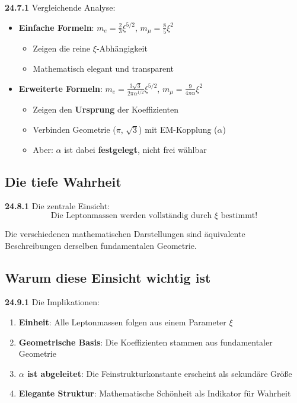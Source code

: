 \documentclass[12pt,a4paper]{article}
\begin{document}
\noindent \textbf{24.7.1} Vergleichende Analyse:
\begin{itemize}
	\item \textbf{Einfache Formeln}: $m_e = \frac{2}{3}\xi^{5/2}$, $m_\mu = \frac{8}{5}\xi^2$
	\begin{itemize}
		\item Zeigen die reine $\xi$-Abhängigkeit
		\item Mathematisch elegant und transparent
	\end{itemize}
	
	\item \textbf{Erweiterte Formeln}: $m_e = \frac{3\sqrt{3}}{2\pi\alpha^{1/2}}\xi^{5/2}$, $m_\mu = \frac{9}{4\pi\alpha}\xi^2$
	\begin{itemize}
		\item Zeigen den \textbf{Ursprung} der Koeffizienten
		\item Verbinden Geometrie ($\pi$, $\sqrt{3}$) mit EM-Kopplung ($\alpha$)
		\item Aber: $\alpha$ ist dabei \textbf{festgelegt}, nicht frei wählbar
	\end{itemize}
\end{itemize}

\subsection{Die tiefe Wahrheit}

\noindent \textbf{24.8.1} Die zentrale Einsicht:
\[
\boxed{
	\text{Die Leptonmassen werden vollständig durch } \xi \text{ bestimmt!}
}
\]

Die verschiedenen mathematischen Darstellungen sind äquivalente Beschreibungen derselben fundamentalen Geometrie.

\subsection{Warum diese Einsicht wichtig ist}

\noindent \textbf{24.9.1} Die Implikationen:
\begin{enumerate}
	\item \textbf{Einheit}: Alle Leptonmassen folgen aus einem Parameter $\xi$
	\item \textbf{Geometrische Basis}: Die Koeffizienten stammen aus fundamentaler Geometrie
	\item \textbf{$\alpha$ ist abgeleitet}: Die Feinstrukturkonstante erscheint als sekundäre Größe
	\item \textbf{Elegante Struktur}: Mathematische Schönheit als Indikator für Wahrheit
\end{enumerate}
\end{document}
